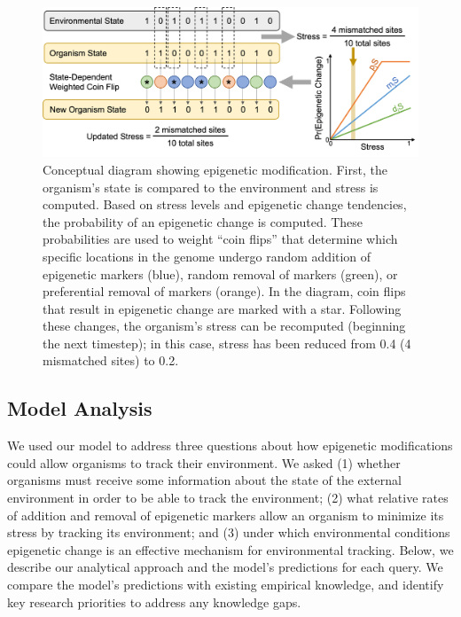 \documentclass{article}
\begin{document}
\begin{figure}
    \centering
    \includegraphics[width=\textwidth]{Figures/ModelDiag_v1.png}
    \caption{Conceptual diagram showing epigenetic modification. First, the organism's state is compared to the environment and stress is computed. Based on stress levels and epigenetic change tendencies, the probability of an epigenetic change is computed. These probabilities are used to weight ``coin flips'' that determine which specific locations in the genome undergo random addition of epigenetic markers (blue), random removal of markers (green), or preferential removal of markers (orange). In the diagram, coin flips that result in epigenetic change are marked with a star. Following these changes, the organism's stress can be recomputed (beginning the next timestep); in this case, stress has been reduced from 0.4 (4 mismatched sites) to 0.2.}
    \label{fig:modeldiag}
\end{figure}

\subsection{Model Analysis}
We used our model to address three questions about how epigenetic modifications could allow organisms to track their environment. We asked (1) whether organisms must receive some information about the state of the external environment in order to be able to track the environment; (2) what relative rates of addition and removal of epigenetic markers allow an organism to minimize its stress by tracking its environment; and (3) under which environmental conditions epigenetic change is an effective mechanism for environmental tracking. Below, we describe our analytical approach and the model's predictions for each query. We compare the model's predictions with existing empirical knowledge, and identify key research priorities to address any knowledge gaps.
\end{document}
